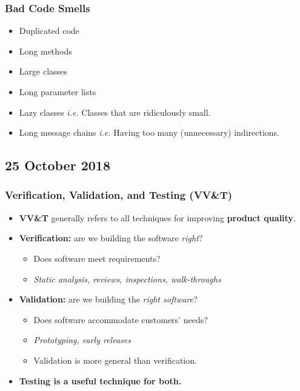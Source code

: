 \documentclass[a4paper]{article}
\providecommand{\tightlist}{%
  \setlength{\itemsep}{0pt}\setlength{\parskip}{0pt}}
\begin{document}
\hypertarget{bad-code-smells}{%
\subsubsection{Bad Code Smells}\label{bad-code-smells}}

\begin{itemize}
\tightlist
\item
  Duplicated code
\item
  Long methods
\item
  Large classes
\item
  Long parameter lists
\item
  Lazy classes \emph{i.e.} Classes that are ridiculously small.
\item
  Long message chains \emph{i.e.} Having too many (unnecessary)
  indirections.
\end{itemize}

\hypertarget{25-october-2018}{%
\subsection{25 October 2018}\label{25-october-2018}}

\hypertarget{verification-validation-and-testing-vvt}{%
\subsubsection{Verification, Validation, and Testing
(VV\&T)}\label{verification-validation-and-testing-vvt}}

\begin{itemize}
\tightlist
\item
  \textbf{VV\&T} generally refers to all techniques for improving
  \textbf{product quality}.
\item
  \textbf{Verification:} are we building the software \emph{right}?

  \begin{itemize}
  \tightlist
  \item
    Does software meet requirements?
  \item
    \emph{Static analysis, reviews, inspections, walk-throughs}
  \end{itemize}
\item
  \textbf{Validation:} are we building the \emph{right software}?

  \begin{itemize}
  \tightlist
  \item
    Does software accommodate customers' needs?
  \item
    \emph{Prototyping, early releases}
  \item
    Validation is more general than verification.
  \end{itemize}
\item
  \textbf{Testing is a useful technique for both.}
\end{itemize}
\end{document}
